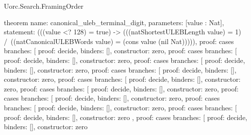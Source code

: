 \begin{lexlean}{Uorc.Search.FramingOrder}
\begin{semanticmodule}
theorem{
  name: canonical_uleb_terminal_digit,
  parameters: [value : Nat],
  statement: (((value <? 128) = true) -> (((natShortestULEBLength value) = 1) /\ ((natCanonicalULEBWords value) = (cons value (nil Nat))))),
  proof: cases{
    branches: [
      {proof: decide{}, binders: [], constructor: zero},
      {
        proof: cases{
          branches: [
            {proof: decide{}, binders: [], constructor: zero},
            {
              proof: cases{
                branches: [
                  {proof: decide{}, binders: [], constructor: zero},
                  {
                    proof: cases{
                      branches: [
                        {proof: decide{}, binders: [], constructor: zero},
                        {
                          proof: cases{
                            branches: [
                              {proof: decide{}, binders: [], constructor: zero},
                              {
                                proof: cases{
                                  branches: [
                                    {proof: decide{}, binders: [], constructor: zero},
                                    {
                                      proof: cases{
                                        branches: [
                                          {proof: decide{}, binders: [], constructor: zero},
                                          {
                                            proof: cases{
                                              branches: [
                                                {proof: decide{}, binders: [], constructor: zero},
                                                {
                                                  proof: cases{
                                                    branches: [
                                                      {
                                                        proof: decide{},
                                                        binders: [],
                                                        constructor: zero
                                                      },
                                                      {
                                                        proof: cases{
                                                          branches: [
                                                            {
                                                              proof: decide{},
                                                              binders: [],
                                                              constructor: zero
}}}}}}}}}}}}}}}}}}}}}
\end{semanticmodule}
\end{lexlean}
